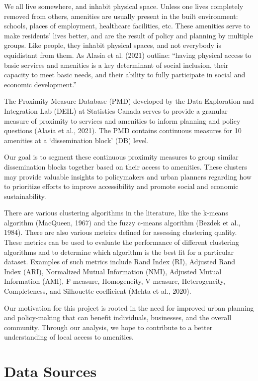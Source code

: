 \documentclass[11pt, a4paper]{article}
\begin{document}
We all live somewhere, and inhabit physical space. Unless one lives completely removed from others, amenities are usually present in the built environment: schools, places of employment, healthcare facilities, etc. These amenities serve to make residents’ lives better, and are the result of policy and planning by multiple groups. Like people, they inhabit physical spaces, and not everybody is equidistant from them. As Alasia et al. (2021) outline: “having physical access to basic services and amenities is a key determinant of social inclusion, their capacity to meet basic needs, and their ability to fully participate in social and economic development.”
\par
The Proximity Measure Database (PMD) developed by the Data Exploration and Integration Lab (DEIL) at Statistics Canada serves to provide a granular measure of proximity to services and amenities to inform planning and policy questions (Alasia et al., 2021). The PMD contains continuous measures for 10 amenities at a ‘dissemination block’ (DB) level.
\par
Our goal is to segment these continuous proximity measures to group similar dissemination blocks together based on their access to amenities. These clusters may provide valuable insights to policymakers and urban planners regarding how to prioritize efforts to improve accessibility and promote social and economic sustainability.
\par
There are various clustering algorithms in the literature, like the k-means algorithm (MacQueen, 1967) and the fuzzy c-means algorithm (Bezdek et al., 1984). There are also various metrics defined for assessing clustering quality. These metrics can be used to evaluate the performance of different clustering algorithms and to determine which algorithm is the best fit for a particular dataset. Examples of such metrics include Rand Index (RI), Adjusted Rand Index (ARI), Normalized Mutual Information (NMI), Adjusted Mutual Information (AMI), F-measure, Homogeneity, V-measure, Heterogeneity, Completeness, and Silhouette coefficient (Mehta et al., 2020).
\par
Our motivation for this project is rooted in the need for improved urban planning and policy-making that can benefit individuals, businesses, and the overall community. Through our analysis, we hope to contribute to a better understanding of local access to amenities.



\section*{Data Sources}
\end{document}
